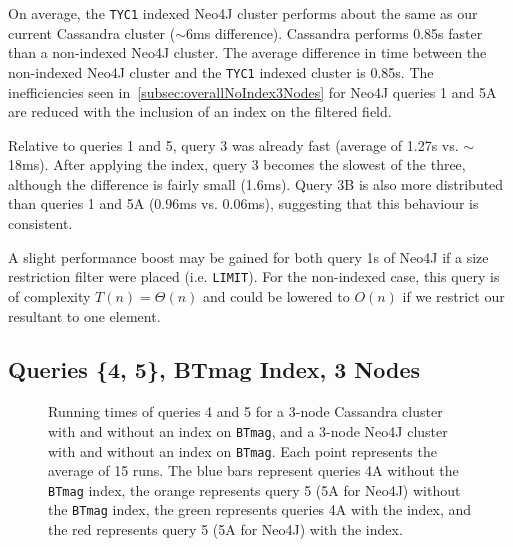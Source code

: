 On average, the \texttt{TYC1} indexed Neo4J cluster performs about the same as our current Cassandra cluster
($\sim$6ms difference).
Cassandra performs 0.85s faster than a non-indexed Neo4J cluster.
The average difference in time between the non-indexed Neo4J cluster and the \texttt{TYC1} indexed cluster is 0.85s.
The inefficiencies seen in~\autoref{subsec:overallNoIndex3Nodes} for Neo4J queries 1 and 5A are reduced with the
inclusion of an index on the filtered field.

Relative to queries 1 and 5, query 3 was already fast (average of 1.27s vs. $\sim$18ms).
After applying the index, query 3 becomes the slowest of the three, although the difference is fairly small (1.6ms).
Query 3B is also more distributed than queries 1 and 5A (0.96ms vs. 0.06ms), suggesting that this behaviour is
consistent.

A slight performance boost may be gained for both query 1s of Neo4J if a size restriction filter were placed (i.e.
\texttt{LIMIT}).
For the non-indexed case, this query is of complexity $T(n) = \Theta(n)$ and could be lowered to $O(n)$ if we
restrict our resultant to one element.

\subsection{Queries \{4, 5\}, BTmag Index, 3 Nodes}\label{subsec:queries45btmagIndex3Nodes}
\begin{figure}
    \caption{Running times of queries 4 and 5 for a 3-node Cassandra cluster with and without an index on
    \texttt{BTmag}, and a 3-node Neo4J cluster with and without an index on \texttt{BTmag}.
    Each point represents the average of 15 runs.
    The blue bars represent queries 4A without the \texttt{BTmag} index, the orange represents query 5 (5A for Neo4J)
    without the \texttt{BTmag} index, the green represents queries 4A with the index, and the red represents query 5
    (5A for Neo4J) with the index.}\label{fig:45ni3}
\end{figure}

